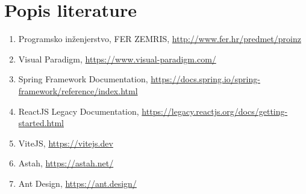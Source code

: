 \chapter*{Popis literature}
	 	
%	
		
		
		\begin{enumerate}
			
			
			\item  Programsko inženjerstvo, FER ZEMRIS, \url{http://www.fer.hr/predmet/proinz}
						
            \item  Visual Paradigm, \url{https://www.visual-paradigm.com/}

            \item  Spring Framework Documentation, \url{https://docs.spring.io/spring-framework/reference/index.html}

            \item  ReactJS Legacy Documentation, \url{https://legacy.reactjs.org/docs/getting-started.html}

			\item  ViteJS, \url{https://vitejs.dev}
			
			\item  Astah, \url{https://astah.net/}
			
			\item  Ant Design, \url{https://ant.design/}
		\end{enumerate}
		
		 
